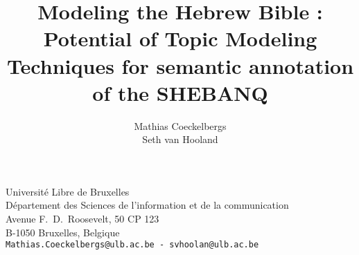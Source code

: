 \documentclass[10pt,a4paper]{article}
\begin{document}
\title{\bf
Modeling the Hebrew Bible :\\Potential of Topic Modeling Techniques for semantic annotation of the SHEBANQ}

\author{
  Mathias Coeckelbergs\\
  Seth van Hooland
}
\date{}

\maketitle

\begin{center}
\vspace{-\baselineskip}
Université Libre de Bruxelles\\ Département des Sciences de l'information et de la communication\\
       Avenue F.\ D.\ Roosevelt, 50 CP 123\\ B-1050 Bruxelles, Belgique\\
       \texttt{Mathias.Coeckelbergs@ulb.ac.be - svhoolan@ulb.ac.be}\\
\end{center}
\end{document}
